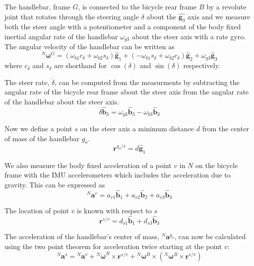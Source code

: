 \documentclass[10pt]{article}
\begin{document}
The handlebar, frame $G$, is connected to the bicycle rear frame $B$ by a
revolute joint that rotates through the steering angle $\delta$ about the
$\hat{\mathbf{g}_3}$ axis and we measure both the steer angle with a
potentiometer and a component of the body fixed inertial angular rate of the
handlebar $\omega_{g3}$ about the steer axis with a rate gyro. The angular
velocity of the handlebar can be written as
%
\begin{equation}
  ^N\boldsymbol{\omega}^G =
    (\omega_{b1}c_\delta + \omega_{b2}s_\delta)\hat{\mathbf{g}}_1 +
    (-\omega_{b1}s_\delta + \omega_{b2}c_\delta)\hat{\mathbf{g}}_2 +
    \omega_{g3}\hat{\mathbf{g}}_3
\end{equation}
%
where $c_\delta$ and $s_\delta$ are shorthand for $\operatorname{cos}(\delta)$
and $\operatorname{sin}(\delta)$ respectively.

The steer rate, $\dot{\delta}$, can be computed from the measurments by
subtracting the angular rate of the bicycle rear frame about the steer axis
from the angular rate of the handlebar about the steer axis.
%
\begin{equation}
  \dot{\delta} \hat{\mathbf{b}}_3 = \omega_{g3} \hat{\mathbf{b}}_3 - \omega_{b3} \hat{\mathbf{b}}_3
\end{equation}

Now we define a point $s$ on the steer axis a minimum distance $d$ from the
center of mass of the handlebar $g_o$.
%
\begin{equation}
  \mathbf{r}^{g_o/s} = d\hat{\mathbf{g}}_1
\end{equation}

We also measure the body fixed acceleration of a point $v$ in $N$ on the
bicycle frame with the IMU accelerometers which includes the acceleration due
to gravity. This can be expressed as
%
\begin{equation}
  ^N\mathbf{a}^v =
    a_{v1}\hat{\mathbf{b}}_1 +
    a_{v2}\hat{\mathbf{b}}_2 +
    a_{v3}\hat{\mathbf{b}}_3
  \label{eq:acceleration-of-v}
\end{equation}

The location of point $v$ is known with respect to $s$
%
\begin{equation}
  \mathbf{r}^{s/v} = d_{s1}\hat{\mathbf{b}}_1 + d_{s3}\hat{\mathbf{b}}_3
\end{equation}

The acceleration of the handlebar's center of mass, $^N\mathbf{a}^{g_o}$, can
now be calculated using the two point theorem for acceleration \cite{Kane1985}
twice starting at the point $v$:
%
\begin{equation}
  ^N\mathbf{a}^s = {}^N\mathbf{a}^v +
    {}^N\dot{\boldsymbol{\omega}}^B\times\mathbf{r}^{s/v} +
    {}^N\boldsymbol{\omega}^B\times({}^N\boldsymbol{\omega}^B\times\mathbf{r}^{s/v})
\end{equation}
\end{document}
